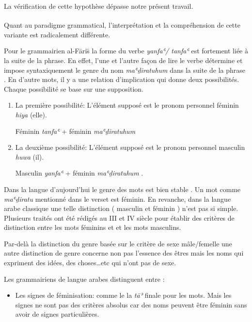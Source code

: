 \documentclass[a4paper,12pt]{report}
\begin{document}
\begin{itemize}
\begin{enumerate}
La vérification de cette hypothèse  dépasse notre présent travail.
\paragraph{}
Quant au paradigme grammatical, l'interprétation et la compréhension de  cette variante est  radicalement différente.

  Pour le grammairien al-F\=ari\=s  la forme du verbe  \textit{yanfaʿ/ tanfaʿ} est fortement liée  à la suite de la phrase. En effet,  l'une et l'autre façon de lire le verbe  détermine et impose syntaxiquement le genre du  nom \textit{maʿḏiratuhum }  dans la suite de la phrase  . En d'autre mots, il y a une relation d'implication qui donne deux possibilités. Chaque possibilité se base sur une supposition.

\begin{enumerate}

    \item   La première  possibilité: L'élément supposé est le pronom personnel  féminin \textit{hiya} (elle). 
 
 Féminin \textit { tanfaʿ} + féminin  \textit{maʿḏiratuhum }     
 
\item  La deuxième possibilité: L'élément supposé est le pronom personnel  masculin  \textit{huwa} (il). 
 
 Masculin   \textit{yanfaʿ}  +  féminin  \textit{maʿḏiratuhum }.

 \end{enumerate}
 
 

Dans la langue d'aujourd'hui  le genre des mots est bien stable . Un mot comme \textit{maʿḏiratu } mentionné dans le verset est féminin. En revanche, dans la langue arabe classique une telle distinction ( masculin et féminin  ) n'est pas si simple. Plusieurs traités ont été rédigés  au III et IV siècle pour établir des critères de distinction entre les mots féminins et et les mots masculins.   


Par-delà la distinction du genre basée sur le critère de sexe mâle/femelle  une autre distinction de genre concerne non pas l’essence des êtres mais les noms qui expriment des idées, des choses…etc qui n’ont pas de sexe. 

 Les grammairiens  de langue arabes distinguent entre : 
 
\begin{itemize}
    \item Les signes de féminisation: comme le la \textit{tāʾ} finale pour les mots. Mais les signes ne sont pas des critères absolus car  des noms peuvent être féminin  sans avoir de signes particulières.
    

\end{itemize}
\end{enumerate}
\end{itemize}
\end{document}

